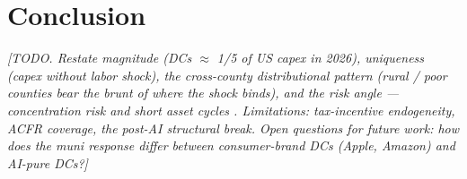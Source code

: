 \section{Conclusion}\label{sec:conclusion}

\noindent\textit{[TODO. Restate magnitude (DCs $\approx$ 1/5 of US capex in 2026), uniqueness (capex without labor shock), the cross-county distributional pattern (rural / poor counties bear the brunt of where the shock binds), and the risk angle — concentration risk and short asset cycles \citep{spratings2026_everywhere}. Limitations: tax-incentive endogeneity, ACFR coverage, the post-AI structural break. Open questions for future work: how does the muni response differ between consumer-brand DCs (Apple, Amazon) and AI-pure DCs?]}
